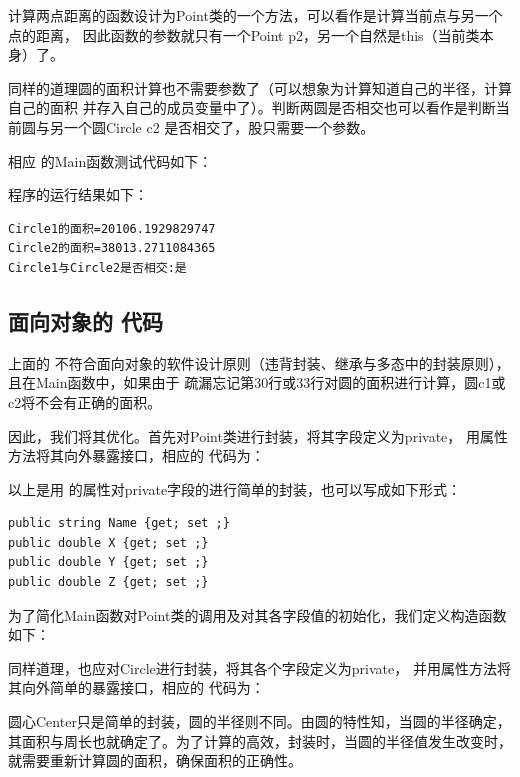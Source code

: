 计算两点距离的函数设计为Point类的一个方法，可以看作是计算当前点与另一个点的距离，
因此函数的参数就只有一个Point p2，另一个自然是this（当前类本身）了。

同样的道理圆的面积计算也不需要参数了（可以想象为计算知道自己的半径，计算自己的面积
并存入自己的成员变量中了）。判断两圆是否相交也可以看作是判断当前圆与另一个圆Circle c2
是否相交了，股只需要一个参数。

相应 \cs 的Main函数测试代码如下：



程序的运行结果如下：
\begin{verbatim}
Circle1的面积=20106.1929829747
Circle2的面积=38013.2711084365
Circle1与Circle2是否相交:是
\end{verbatim}

\subsection{面向对象的 \cs 代码}
上面的 \cs 不符合面向对象的软件设计原则（违背封装、继承与多态中的封装原则），且在Main函数中，如果由于
疏漏忘记第30行或33行对圆的面积进行计算，圆c1或c2将不会有正确的面积。

因此，我们将其优化。首先对Point类进行封装，将其字段定义为private，
用属性方法将其向外暴露接口，相应的 \cs 代码为：



以上是用 \cs 的属性对private字段的进行简单的封装，也可以写成如下形式：
\begin{lstlisting}
public string Name {get; set ;}
public double X {get; set ;}
public double Y {get; set ;}
public double Z {get; set ;}
\end{lstlisting}

为了简化Main函数对Point类的调用及对其各字段值的初始化，我们定义构造函数如下：


同样道理，也应对Circle进行封装，将其各个字段定义为private，
并用属性方法将其向外简单的暴露接口，相应的 \cs 代码为：



圆心Center只是简单的封装，圆的半径则不同。由圆的特性知，当圆的半径确定，
其面积与周长也就确定了。为了计算的高效，封装时，当圆的半径值发生改变时，
就需要重新计算圆的面积，确保面积的正确性。


